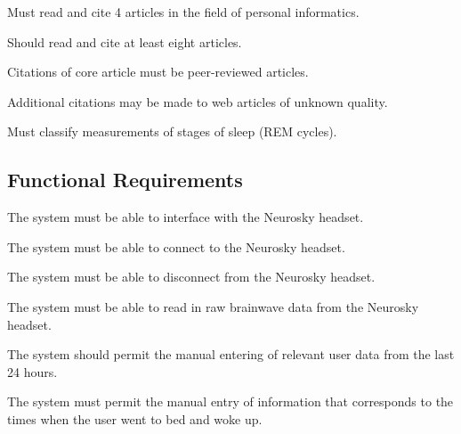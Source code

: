 \begin{reqtable}
  \reqheader

  {Must read and cite 4 articles in the field of personal informatics.}
  \phigh
  \sspec

  {Should read and cite at least eight articles.}
  \pmed
  \sspec

  {Citations of core article must be peer-reviewed articles.}
  \phigh
  \deps{\ref{req:4-articles}}
  \sspec

  {Additional citations may be made to web articles of unknown quality.}
  \plow
  \sspec

  {Must classify measurements of stages of sleep (REM cycles).}
  \phigh
\end{reqtable}

\subsection{Functional Requirements}\label{ssec:functional-requirements}

\begin{reqtable}
  \reqheader

  {The system must be able to interface with the Neurosky headset.}
  \phigh
  \deps{\ref{sreq:connect-headset}, \ref{sreq:disconnect-headset}, \ref{sreq:read-data-headset}}

  {The system must be able to connect to the Neurosky headset.}
  \phigh

  {The system must be able to disconnect from the Neurosky headset.}
  \phigh
  \deps{\ref{sreq:connect-headset}}

  {The system must be able to read in raw brainwave data from the Neurosky headset.}
  \phigh
  \deps{\ref{sreq:connect-headset}}

  {The system should permit the manual entering of relevant user data from the last 24 hours.}
  \pmed
  \deps{\ref{sreq:manual-entry-bed-woke}}

  {The system must permit the manual entry of information that corresponds to the times when the
    user went to bed and woke up.}
  \pmed
\end{reqtable}
